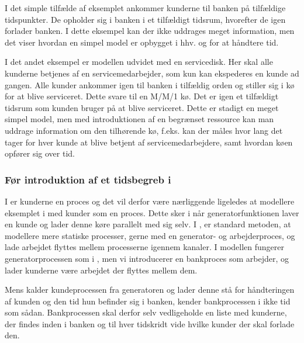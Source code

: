 I det simple tilfælde af eksemplet ankommer kunderne til banken på 
tilfældige tidspunkter.  De opholder sig i banken i et tilfældigt 
tidsrum, hvorefter de igen forlader banken. I dette eksempel kan der ikke 
uddrages meget information, men det viser hvordan en simpel model er opbygget i 
hhv.  \simpy og \pycsp for at håndtere tid.

I det andet eksempel er modellen udvidet med en servicedisk. Her skal alle 
kunderne betjenes af en servicemedarbejder, som kun kan ekspederes en kunde ad 
gangen. Alle kunder ankommer igen til banken i tilfældig orden og stiller sig i 
kø for at blive serviceret. Dette  svare til en M/M/1 kø. Det er igen et tilfældigt tidsrum som kunden bruger på at blive 
serviceret.  Dette er stadigt en meget simpel model, men med introduktionen af 
en begrænset ressource kan man uddrage information om den tilhørende kø, f.eks. 
kan der måles hvor lang det tager for hver kunde at blive betjent af 
servicemedarbejdere, samt hvordan køen opfører sig over tid. 

\subsubsection{Før introduktion af et tidsbegreb i \pycsp}
I \simpy er kunderne en proces og det vil derfor være nærliggende ligeledes at 
modellere eksemplet i \pycsp med kunder som en proces. Dette sker i  \simpy når
generatorfunktionen laver en kunde og lader denne køre parallelt med sig selv.  
I \pycsp, er standard metoden, at 
modellere mere statiske processer, gerne med en generator- og 
arbejderproces, og lade arbejdet flyttes 
mellem processerne igennem kanaler. I \pycsp modellen fungerer 
generatorprocessen som i \simpy, men vi introducerer en bankproces 
som arbejder, og lader kunderne være arbejdet der flyttes mellem dem. 

Mens \simpy kalder kundeprocessen fra generatoren og lader denne stå for håndteringen af kunden 
og den tid hun befinder sig i banken, kender bankprocessen i \pycsp ikke tid som 
sådan. Bankprocessen skal derfor selv vedligeholde en liste med kunderne, der findes inden i banken og til hver 
tidskridt vide hvilke kunder der skal forlade den. 

